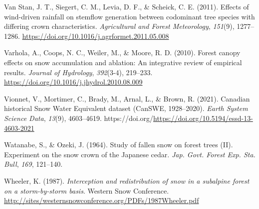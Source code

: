 \documentclass[
  letterpaper,
  DIV=11,
  numbers=noendperiod]{scrartcl}
\newlength{\cslhangindent}
\newenvironment{CSLReferences}[2] %
 {\begin{list}{}{%
  \setlength{\itemindent}{0pt}
  \setlength{\leftmargin}{0pt}
  \setlength{\parsep}{0pt}
  \ifodd #1
   \setlength{\leftmargin}{\cslhangindent}
   \setlength{\itemindent}{-1\cslhangindent}
  \fi
  \setlength{\itemsep}{#2\baselineskip}}}
 {\end{list}}
\begin{document}
\begin{CSLReferences}{1}{0}
Van Stan, J. T., Siegert, C. M., Levia, D. F., \& Scheick, C. E. (2011).
{Effects of wind-driven rainfall on stemflow generation between
codominant tree species with differing crown characteristics}.
\emph{Agricultural and Forest Meteorology}, \emph{151}(9), 1277--1286.
\url{https://doi.org/10.1016/j.agrformet.2011.05.008}

Varhola, A., Coops, N. C., Weiler, M., \& Moore, R. D. (2010). {Forest
canopy effects on snow accumulation and ablation: An integrative review
of empirical results}. \emph{Journal of Hydrology}, \emph{392}(3-4),
219--233. \url{https://doi.org/10.1016/j.jhydrol.2010.08.009}

Vionnet, V., Mortimer, C., Brady, M., Arnal, L., \& Brown, R. (2021).
{Canadian historical Snow Water Equivalent dataset (CanSWE,
1928--2020)}. \emph{Earth System Science Data}, \emph{13}(9),
4603--4619.
https://doi.org/\url{https://doi.org/10.5194/essd-13-4603-2021}

Watanabe, S., \& Ozeki, J. (1964). {Study of fallen snow on forest trees
(II). Experiment on the snow crown of the Japanese cedar}. \emph{Jap.
Govt. Forest Exp. Sta. Bull}, \emph{169}, 121--140.

Wheeler, K. (1987). \emph{{Interception and redistribution of snow in a
subalpine forest on a storm-by-storm basis}}. Western Snow Conference.
\url{http://sites/westernsnowconference.org/PDFs/1987Wheeler.pdf}

\end{CSLReferences}
\end{document}
